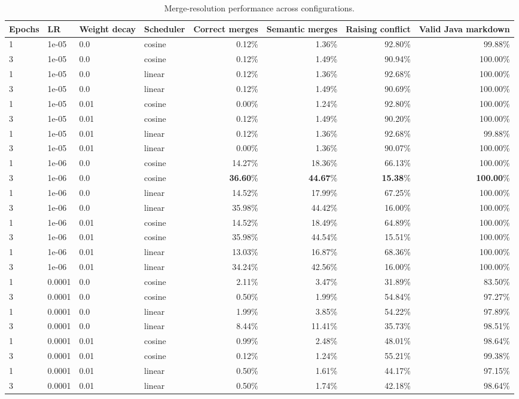 \begin{table}[ht]
\centering
\begin{tabular}{l l l l r r r r}
\toprule
Epochs & LR & Weight decay & Scheduler & Correct merges & Semantic merges & Raising conflict & Valid Java markdown \\
\midrule
1 & 1e-05 & 0.0 & cosine & 0.12\% & 1.36\% & 92.80\% & 99.88\% \\
3 & 1e-05 & 0.0 & cosine & 0.12\% & 1.49\% & 90.94\% & 100.00\% \\
1 & 1e-05 & 0.0 & linear & 0.12\% & 1.36\% & 92.68\% & 100.00\% \\
3 & 1e-05 & 0.0 & linear & 0.12\% & 1.49\% & 90.69\% & 100.00\% \\
1 & 1e-05 & 0.01 & cosine & 0.00\% & 1.24\% & 92.80\% & 100.00\% \\
3 & 1e-05 & 0.01 & cosine & 0.12\% & 1.49\% & 90.20\% & 100.00\% \\
1 & 1e-05 & 0.01 & linear & 0.12\% & 1.36\% & 92.68\% & 99.88\% \\
3 & 1e-05 & 0.01 & linear & 0.00\% & 1.36\% & 90.07\% & 100.00\% \\
1 & 1e-06 & 0.0 & cosine & 14.27\% & 18.36\% & 66.13\% & 100.00\% \\
3 & 1e-06 & 0.0 & cosine & \textbf{36.60}\% & \textbf{44.67}\% & \textbf{15.38}\% & \textbf{100.00}\% \\
1 & 1e-06 & 0.0 & linear & 14.52\% & 17.99\% & 67.25\% & 100.00\% \\
3 & 1e-06 & 0.0 & linear & 35.98\% & 44.42\% & 16.00\% & 100.00\% \\
1 & 1e-06 & 0.01 & cosine & 14.52\% & 18.49\% & 64.89\% & 100.00\% \\
3 & 1e-06 & 0.01 & cosine & 35.98\% & 44.54\% & 15.51\% & 100.00\% \\
1 & 1e-06 & 0.01 & linear & 13.03\% & 16.87\% & 68.36\% & 100.00\% \\
3 & 1e-06 & 0.01 & linear & 34.24\% & 42.56\% & 16.00\% & 100.00\% \\
1 & 0.0001 & 0.0 & cosine & 2.11\% & 3.47\% & 31.89\% & 83.50\% \\
3 & 0.0001 & 0.0 & cosine & 0.50\% & 1.99\% & 54.84\% & 97.27\% \\
1 & 0.0001 & 0.0 & linear & 1.99\% & 3.85\% & 54.22\% & 97.89\% \\
3 & 0.0001 & 0.0 & linear & 8.44\% & 11.41\% & 35.73\% & 98.51\% \\
1 & 0.0001 & 0.01 & cosine & 0.99\% & 2.48\% & 48.01\% & 98.64\% \\
3 & 0.0001 & 0.01 & cosine & 0.12\% & 1.24\% & 55.21\% & 99.38\% \\
1 & 0.0001 & 0.01 & linear & 0.50\% & 1.61\% & 44.17\% & 97.15\% \\
3 & 0.0001 & 0.01 & linear & 0.50\% & 1.74\% & 42.18\% & 98.64\% \\
\bottomrule
\end{tabular}
\caption{Merge-resolution performance across configurations.}
\end{table}
